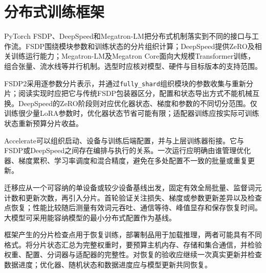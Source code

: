 \documentclass[../textbook.tex]{subfiles}
\begin{document}
\section{分布式训练框架}

PyTorch FSDP、DeepSpeed和Megatron-LM把分布式机制落实到不同的接口与工作流。FSDP围绕模块参数和训练状态的分片组织计算；DeepSpeed提供ZeRO及相关训练运行能力；Megatron-LM及Megatron Core面向大规模Transformer训练，组合张量、流水线等并行机制\cite{pytorch2026fsdp2,deepspeed2026framework,megatron2026framework}。选型时应核对模型、硬件与目标版本的支持范围。

FSDP2采用逐参数分片表示，并通过\texttt{fully\_shard}组织模块的参数收集与重新分片；阅读实现时应把它与传统FSDP包装器区分，配置和状态导出方式不能机械互换\cite{pytorch2026fsdp2}。DeepSpeed的ZeRO阶段则对应优化器状态、梯度和参数的不同切分范围。仅训练很少量LoRA参数时，优化器状态节省可能有限；适配器训练应按实际可训练状态重新预算分片收益。

Accelerate可以组织启动、设备与训练后端配置，并与上层训练器衔接\cite{huggingface2026accelerateframework}。它与FSDP或DeepSpeed之间存在编排与执行的关系。一次运行应明确由谁管理优化器、梯度累积、学习率调度和混合精度，避免在多处配置不一致的批量或重复更新。

迁移应从一个可容纳的单设备或较少设备基线出发，固定有效全局批量、监督词元计数和更新次数，再引入分片。首轮验证关注损失、梯度或参数更新差异以及检查点恢复；性能比较随后测量有效词元吞吐、通信等待、峰值显存和保存恢复时间。大模型可采用能容纳模型的最小分布式配置作为基线。

框架产生的分片检查点用于恢复训练，部署制品用于加载推理，两者可能具有不同格式。将分片状态汇总为完整权重时，要预算主机内存、存储和集合通信，并检验权重、配置、分词器与适配器的完整性。对恢复的验收应继续一次真实更新并检查数据进度；优化器、随机状态和数据进度应与模型更新共同恢复。

\chapterreferences
\myendchapterdocument
\end{document}
